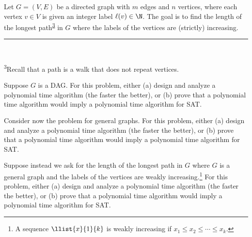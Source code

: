 \documentclass{article}
\begin{document}
\setcounter{section}{12}
\setcounter{exercise}{10}

 Let $ G = (V, E) $ be a directed graph with $ m $ edges and $ n $ vertices, where each vertex $v \in V$ is given an integer label $\ell(v) \in\N$.
The goal is to find the length of the longest path\textsuperscript{\hyperref[fn:path]{3}} in $ G $ where the labels of the vertices are (strictly) increasing.\\
\noindent\rule{2in}{0.4pt} \\
\parbox{\linewidth}{\small \textsuperscript{\label{fn:path}3}Recall that a path is a walk that does not repeat vertices.}

\begin{subexercise}
  Suppose $G$ is a DAG. For this problem, either (a) design and analyze a polynomial time algorithm (the faster the better), or (b) prove that a polynomial time algorithm would imply a polynomial time algorithm for SAT.
\end{subexercise}

\begin{solution}

\end{solution}
\pagebreak

\begin{subexercise}
  Consider now the problem for general graphs. For this problem, either (a) design and analyze a polynomial time algorithm (the faster the better), or (b) prove that a polynomial time algorithm would imply a polynomial time algorithm for SAT.
\end{subexercise}

\begin{solution}

\end{solution}
\pagebreak

\begin{subexercise}
  Suppose instead we ask for the length of the longest path in $G$ where $G$ is a general graph and the labels of the vertices are weakly increasing.\footnote[4]{A sequence $ \llist{x}{1}{k} $ is weakly increasing if $ x_1\leq x_2\leq \cdots\leq x_k $.}
  For this problem, either (a) design and analyze a polynomial time algorithm (the faster the better), or (b) prove that a polynomial time algorithm would imply a polynomial time algorithm for SAT.
\end{subexercise}

\begin{solution}

\end{solution}
\end{document}
